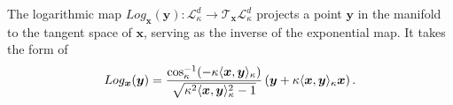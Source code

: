 The logarithmic map $Log_{\boldsymbol x}(\boldsymbol y):  \mathcal L_{\kappa }^{d} \to \mathcal T_{\boldsymbol x}\mathcal L_{\kappa }^{d} $ projects a point $\boldsymbol  y$  in the manifold to the tangent space of $\boldsymbol  x$, serving as the inverse of the exponential map. 
It takes the form of 
\vspace{-0.05in}
\begin{equation}
Log_{\boldsymbol x}(\boldsymbol y) = \frac{\operatorname{cos}_\kappa^{-1}(-\kappa\langle \boldsymbol x, \boldsymbol y\rangle_\kappa)}{\sqrt{\kappa^2\langle \boldsymbol x, \boldsymbol y\rangle_\kappa^2 - 1}} \left(\boldsymbol y + \kappa\langle \boldsymbol x, \boldsymbol y\rangle_\kappa \boldsymbol x\right).
\vspace{-0.03in}
\end{equation}




